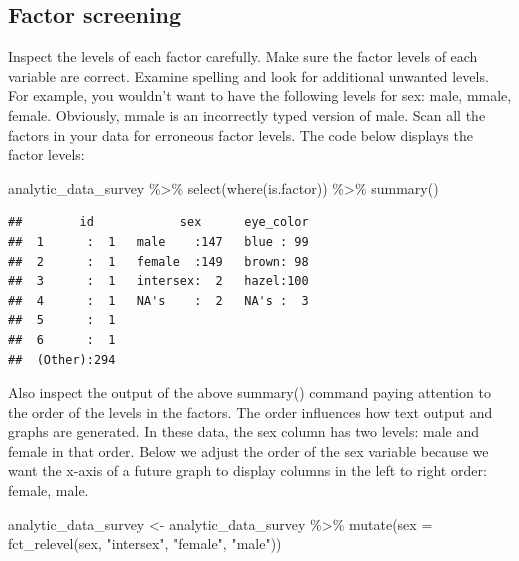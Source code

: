 \documentclass[
]{krantz}
\makeatletter
\newenvironment{Shaded}{\begin{snugshade}}{\end{snugshade}}
\newcommand{\AttributeTok}[1]{\textcolor[rgb]{0.61,0.61,0.61}{#1}}
\newcommand{\FunctionTok}[1]{\textcolor[rgb]{0,0,0}{#1}}
\newcommand{\NormalTok}[1]{#1}
\newcommand{\OtherTok}[1]{\textcolor[rgb]{0.37,0.37,0.37}{#1}}
\newcommand{\SpecialCharTok}[1]{\textcolor[rgb]{0,0,0}{#1}}
\newcommand{\StringTok}[1]{\textcolor[rgb]{0.5,0.5,0.5}{#1}}
\newenvironment{kframe}{%
\medskip{}
\setlength{\fboxsep}{.8em}
 \def\at@end@of@kframe{}%
 \ifinner\ifhmode%
  \def\at@end@of@kframe{\end{minipage}}%
  \begin{minipage}{\columnwidth}%
 \fi\fi%
 \def\FrameCommand##1{\hskip\@totalleftmargin \hskip-\fboxsep
 \colorbox{shadecolor}{##1}\hskip-\fboxsep
     \hskip-\linewidth \hskip-\@totalleftmargin \hskip\columnwidth}%
 \MakeFramed {\advance\hsize-\width
   \@totalleftmargin\z@ \linewidth\hsize
   \@setminipage}}%
 {\par\unskip\endMakeFramed%
 \at@end@of@kframe}
\renewenvironment{Shaded}{\begin{kframe}}{\end{kframe}}
\makeatother
\begin{document}
\hypertarget{factor-screening-5}{%
\subsection{Factor screening}\label{factor-screening-5}}

Inspect the levels of each factor carefully. Make sure the factor levels of each variable are correct. Examine spelling and look for additional unwanted levels. For example, you wouldn't want to have the following levels for sex: male, mmale, female. Obviously, mmale is an incorrectly typed version of male. Scan all the factors in your data for erroneous factor levels. The code below displays the factor levels:

\begin{Shaded}
\begin{Highlighting}[]
\NormalTok{analytic\_data\_survey }\SpecialCharTok{\%\textgreater{}\%}
  \FunctionTok{select}\NormalTok{(}\FunctionTok{where}\NormalTok{(is.factor)) }\SpecialCharTok{\%\textgreater{}\%}
  \FunctionTok{summary}\NormalTok{()}
\end{Highlighting}
\end{Shaded}

\begin{verbatim}
##        id            sex      eye_color  
##  1      :  1   male    :147   blue : 99  
##  2      :  1   female  :149   brown: 98  
##  3      :  1   intersex:  2   hazel:100  
##  4      :  1   NA's    :  2   NA's :  3  
##  5      :  1                             
##  6      :  1                             
##  (Other):294
\end{verbatim}

Also inspect the output of the above summary() command paying attention to the order of the levels in the factors. The order influences how text output and graphs are generated. In these data, the sex column has two levels: male and female in that order. Below we adjust the order of the sex variable because we want the x-axis of a future graph to display columns in the left to right order: female, male.

\begin{Shaded}
\begin{Highlighting}[]
\NormalTok{analytic\_data\_survey }\OtherTok{\textless{}{-}}\NormalTok{ analytic\_data\_survey }\SpecialCharTok{\%\textgreater{}\%}
  \FunctionTok{mutate}\NormalTok{(}\AttributeTok{sex =} \FunctionTok{fct\_relevel}\NormalTok{(sex,}
                           \StringTok{"intersex"}\NormalTok{,}
                           \StringTok{"female"}\NormalTok{,}
                           \StringTok{"male"}\NormalTok{))}
\end{Highlighting}
\end{Shaded}
\end{document}
